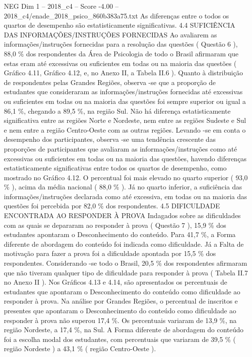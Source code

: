 \begin{textsample}{NEG Dim 1 – 2018\_c4 – Score -4.00 – 2018\_c4/enade\_2018\_psico\_860b383a75.txt}
As diferenças entre o todos os quartos de desempenho são estatisticamente significativas. 4.4 SUFICIÊNCIA DAS INFORMAÇÕES/INSTRUÇÕES FORNECIDAS Ao avaliarem as informações/instruções fornecidas para a resolução das questões ( Questão 6 ), 88,0 \% dos respondentes da Área de Psicologia de todo o Brasil afirmaram que estas eram até excessivas ou suficientes em todas ou na maioria das questões ( Gráfico 4.11, Gráfico 4.12, e, no Anexo II, a Tabela II.6 ).
Quanto à distribuição de respondentes pelas Grandes Regiões, observa -se que a proporção de estudantes que consideraram as informações/instruções fornecidas até excessivas ou suficientes em todas ou na maioria das questões foi sempre superior ou igual a 86,1 \%, chegando a 89,5 \%, na região Sul.
Não há diferença estatisticamente significativa entre as regiões Norte e Nordeste, nem entre as regiões Sudeste e Sul e nem entre a região Centro-Oeste com as outras regiões.
Levando -se em conta o desempenho dos participantes, observa -se uma tendência crescente das proporções de participantes que avaliaram as informações/instruções como até excessivas ou suficientes em todas ou na maioria das questões, havendo diferenças estatisticamente significativas entre todos os quartos de desempenho, como mostrado no Gráfico 4.12.
O percentual foi mais elevado no quarto superior ( 93,0 \% ), acima da média nacional ( 88,0 \% ).
Já no quarto inferior, a suficiência das informações/instruções declarada como até excessiva, em todas ou na maioria das questões foi percebida por 82,0 \% dos respondentes. 4.5 DIFICULDADE ENCONTRADA AO RESPONDER À PROVA Indagados sobre as dificuldades com as quais se depararam ao responder à prova ( Questão 7 ), 15,9 \% dos estudantes apontaram o Desconhecimento do conteúdo.
Para 41,7 \%, a Forma diferente de abordagem do conteúdo foi indicada como dificuldade.
Já a Falta de motivação para fazer a prova foi a dificuldade apontada por 15,5 \% dos respondentes.
Considerando -se todo o Brasil, 20,5 \% dos respondentes afirmaram que não tiveram qualquer tipo de dificuldade para responder à prova ( Tabela II.7 no Anexo II ).
Nos Gráficos 4.13 e 4.14, são apresentados os percentuais de estudantes que apontaram o Desconhecimento do conteúdo como dificuldade ao responder à prova.
Na análise por Grandes Regiões, o percentual de inscritos e presentes que apontaram o Desconhecimento do conteúdo como dificuldade ao responder à prova não superou 17,4 \%.
Os percentuais variaram de 13,9 \%, na região Nordeste, a 17,4 \%, na Sul.
A Forma diferente de abordagem do conteúdo foi a escolha modal dos estudantes, com percentuais que variaram de 39,5 \% ( região Nordeste ) a 43,1 \% ( região Centro-Oeste ).

\end{textsample}
